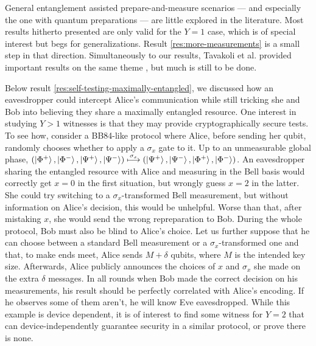    General entanglement assisted prepare-and-measure scenarios --- and especially the one with quantum preparations --- are little explored in the literature. Most results hitherto presented are only valid for the $Y=1$ case, which is of special interest but begs for generalizations. Result \ref{res:more-measurements} is a small step in that direction. Simultaneously to our results, Tavakoli et al. provided important results on the same theme \cite{tavakoli_eapam_2021}, but much is still to be done.

    Below result \ref{res:self-testing-maximally-entangled}, we discussed how an eavesdropper could intercept Alice's communication while still tricking she and Bob into believing they share a maximally entangled resource. One interest in studying $Y > 1$ witnesses is that they may provide cryptographically secure tests. To see how, consider a BB84-like protocol \cite{bb84} where Alice, before sending her qubit, randomly chooses whether to apply a $\sigma_x$ gate to it. Up to an unmeasurable global phase, $\left( \ket{\Phi^+}, \ket{\Phi^-}, \ket{\Psi^+}, \ket{\Psi^-} \right) \overset{\sigma_x}{\longmapsto} ( \ket{\Psi^+}, \ket{\Psi^-}, \ket{\Phi^+}, \ket{\Phi^-})$. An eavesdropper sharing the entangled resource with Alice and measuring in the Bell basis would correctly get $x=0$ in the first situation, but wrongly guess $x=2$ in the latter. She could try switching to a $\sigma_x$-transformed Bell measurement, but without information on Alice's decision, this would be unhelpful. Worse than that, after mistaking $x$, she would send the wrong repreparation to Bob. During the whole protocol, Bob must also be blind to Alice's choice. Let us further suppose that he can choose between a standard Bell measurement or a $\sigma_x$-transformed one and that, to make ends meet, Alice sends $M + \delta$ qubits, where $M$ is the intended key size. Afterwards, Alice publicly announces the choices of $x$ and $\sigma_x$ she made on the extra $\delta$ messages. In all rounds when Bob made the correct decision on his measurements, his result should be perfectly correlated with Alice's encoding. If he observes some of them aren't, he will know Eve eavesdropped. While this example is device dependent, it is of interest to find some witness for $Y=2$ that can device-independently guarantee security in a similar protocol, or prove there is none.


